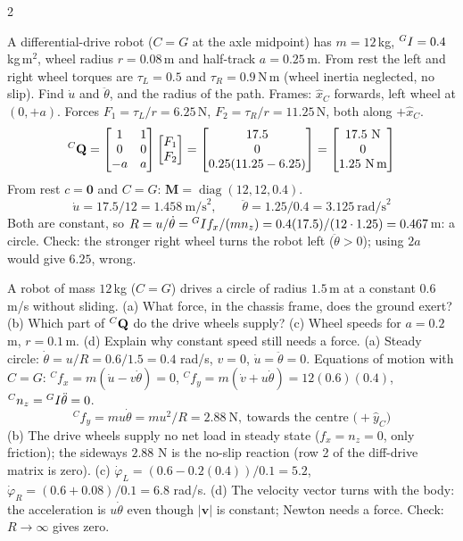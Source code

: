 \begin{multicols}{2}
\begin{examq}
A differential-drive robot ($C=G$ at the axle midpoint) has $m=12$\,kg, ${}^{G}I=0.4$\,kg\,m$^2$, wheel radius $r=0.08$\,m and half-track $a=0.25$\,m. From rest the left and right wheel torques are $\tau_L=0.5$ and $\tau_R=0.9$\,N\,m (wheel inertia neglected, no slip). Find $\dot u$ and $\ddot\theta$, and the radius of the path.
\solution
Frames: $\hat x_C$ forwards, left wheel at $(0,+a)$. Forces $F_1=\tau_L/r=6.25$\,N, $F_2=\tau_R/r=11.25$\,N, both along $+\hat x_C$.
\[\wEQC=\begin{bmatrix}1&1\\0&0\\-a&a\end{bmatrix}\begin{bmatrix}F_1\\F_2\end{bmatrix}=\begin{bmatrix}17.5\\0\\0.25(11.25-6.25)\end{bmatrix}=\begin{bmatrix}17.5\ \text{N}\\0\\1.25\ \text{N\,m}\end{bmatrix}\]
From rest $c=\mathbf 0$ and $C=G$: $\mathbf M=\operatorname{diag}(12,12,0.4)$.
\[\boxed{\dot u=17.5/12=1.458\ \text{m/s}^2,\qquad\ddot\theta=1.25/0.4=3.125\ \text{rad/s}^2}\]
Both are constant, so $R=u/\dot\theta={}^{G}I f_x/(mn_z)=0.4(17.5)/(12\cdot1.25)=0.467$\,m: a circle. Check: the stronger right wheel turns the robot left ($\ddot\theta>0$); using $2a$ would give $6.25$, wrong. \chk
\end{examq}

\begin{examq}
A robot of mass $12$\,kg ($C=G$) drives a circle of radius $1.5$\,m at a constant $0.6$\,m/s without sliding. (a) What force, in the chassis frame, does the ground exert? (b) Which part of ${}^{C}\mathbf Q$ do the drive wheels supply? (c) Wheel speeds for $a=0.2$\,m, $r=0.1$\,m. (d) Explain why constant speed still needs a force.
\solution
(a) Steady circle: $\dot\theta=u/R=0.6/1.5=0.4$ rad/s, $v=0$, $\dot u=\ddot\theta=0$. Equations of motion with $C=G$: ${}^Cf_x=m(\dot u-v\dot\theta)=0$, ${}^Cf_y=m(\dot v+u\dot\theta)=12(0.6)(0.4)$, ${}^Cn_z={}^{G}I\ddot\theta=0$.
\[\boxed{{}^Cf_y=mu\dot\theta=mu^2/R=2.88\ \text{N},\ \text{towards the centre (}+\hat y_C\text{)}}\]
(b) The drive wheels supply no net load in steady state ($f_x=n_z=0$, only friction); the sideways $2.88$ N is the no-slip reaction (row 2 of the diff-drive matrix is zero). (c) $\dot\varphi_L=(0.6-0.2(0.4))/0.1=5.2$, $\dot\varphi_R=(0.6+0.08)/0.1=6.8$ rad/s. (d) The velocity vector turns with the body: the acceleration is $u\dot\theta$ even though $|\mathbf v|$ is constant; Newton needs a force. Check: $R\to\infty$ gives zero. \chk
\end{examq}


\end{multicols}
